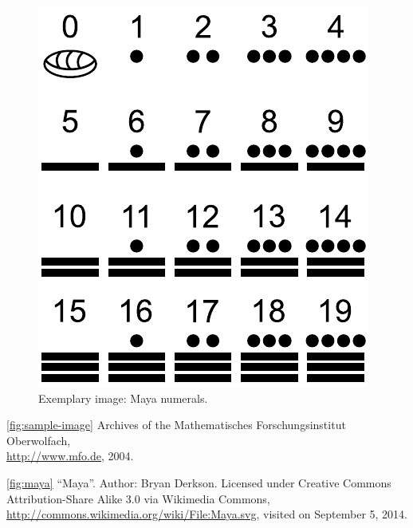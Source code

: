 \documentclass{snapshotmfo}
\begin{document}
\begin{figure}[ht]
        \centering 
        \includegraphics[width= 0.33 \textwidth]{maya.pdf}
        \caption{Exemplary image: Maya numerals.}
\label{fig:maya}
\end{figure}

\begin{imagecredits}
  \item[\autoref{fig:sample-image}] Archives of the Mathematisches Forschungsinstitut Oberwolfach,\\\url{http://www.mfo.de}, 2004.
  \item[\autoref{fig:maya}] ``Maya''. Author: Bryan Derkson. Licensed under Creative Commons Attribution-Share Alike 3.0 via Wikimedia Commons, \url{http://commons.wikimedia.org/wiki/File:Maya.svg}, visited on September 5, 2014.
\end{imagecredits}
\end{document}

